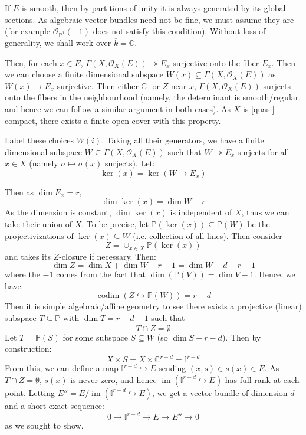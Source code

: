 \documentclass{book}
\newcommand{\C}{{\mathbb{C}}}
\newcommand{\BI}{{\mathbb{I}}}
\renewcommand{\P}{{\mathbb{P}}}
\newcommand{\CO}{{\mathcal{O}}}
\newcommand{\im}{{\operatorname{im}}}
\newcommand{\codim}{{\operatorname{codim}}}
\newcommand{\sse}{\subseteq}
\begin{document}
\begin{Proof}
  If $E$ is smooth, then by partitions of unity it is always generated by its global sections. As algebraic
  vector bundles need not be fine, we must assume they are (for example $\CO_{\P^1}(-1)$ does not satisfy this
  condition). Without loss of generality, we shall work over $\overline{k} = \C$.

  Then, for each $x \in E$, $\Gamma(X, \CO_X(E)) \twoheadrightarrow E_x$ surjective onto the fiber $E_x$. Then
  we can choose a finite dimensional subspace $W(x) \sse \Gamma(X, \CO_X(E))$  as $W(x) \to E_x$ surjective. Then
  either $\C$- or $Z$-near $x$, $\Gamma(X, \CO_X(E))$ surjects onto the fibers in the neighbourhood (namely,
  the determinant is smooth/regular, and hence we can follow a similar argument in both cases). As $X$ is
  [quasi]-compact, there exists a finite open cover with this property.

  Label these choices $W(i)$. Taking all their generators, we have a finite dimensional subspace $W \sse
  \Gamma(X, \CO_X(E))$ such that $W \twoheadrightarrow E_x$ surjects for all $ x\in X$ (namely $\sigma \mapsto
  \sigma(x)$ surjects). Let:
  \[
    \ker(x) = \ker(W \to E_x)
  \]

  Then as $\dim E_x = r$,
  \[
    \dim \ker(x) = \dim W - r
  \]
  As the dimension is constant, $\dim\ker(x)$ is independent of $X$, thus we can take their union of $X$. To
  be precise, let $\P(\ker(x))\sse \P(W)$ be the projectivizations of $\ker(x) \sse W$ (i.e. collection of all
  lines). Then consider
  \[
    Z = \cup_{x \in X} \P(\ker(x))
  \]
  and takes its $Z$-closure if necessary. Then:
  \[
    \dim Z = \dim X + \dim W - r-1 = \dim W  + d-r-1
  \]
  where the $-1$ comes from the fact that $\dim(\P(V))  = \dim V - 1$. Hence, we have:
  \[
    \codim(Z \hookrightarrow \P(W)) = r-d
  \]
  Then it is simple algebraic/affine geometry to see there exists a projective (linear) subspace $T \sse \P$ with $\dim
  T = r-d-1$ such that
  \[
    T\cap Z = \emptyset
  \]
  Let $T = \P(S)$ for some subspace $S \sse W$ (so $\dim S - r-d)$. Then by construction:
  \[
    X\times S = X \times \C^{r-d} = \BI^{r-d}
  \]
  From this, we can define a map $\BI^{r-d} \hookrightarrow E$ sending $(x,s) \in s(x) \in E$. As $T\cap
  Z  = \emptyset$, $s(x)$ is never zero, and hence $\im(\BI^{r-d} \hookrightarrow E)$ has full rank at each
  point. Letting $E'' = E/\im(\BI^{r-d} \hookrightarrow E)$, we get a vector bundle of dimension $d$
  and a short exact sequence:
  \[
    0 \to \BI^{r-d} \to E \to E'' \to 0
  \]
  as we sought to show.
\end{Proof}
\end{document}
